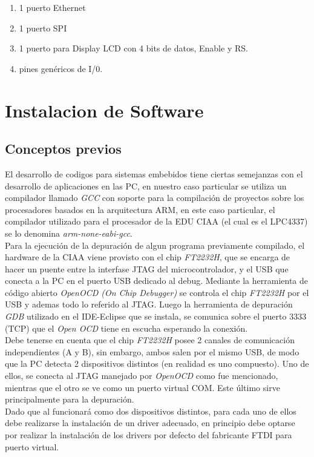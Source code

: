 \documentclass[12pt,letterpaper]{article}
\begin{document}
\begin{enumerate}
\item 1 puerto Ethernet
\item 1 puerto SPI
\item 1 puerto para Display LCD con 4 bits de datos, Enable y RS.
\item pines genéricos de I/0.
\end{enumerate}

\section{Instalacion de Software}

\subsection{Conceptos previos}
El desarrollo de codigos para sistemas embebidos tiene ciertas semejanzas con el desarrollo de aplicaciones en las PC, en nuestro caso particular se utiliza un compilador llamado \textit{GCC} con soporte para la compilación de proyectos sobre los procesadores basados en la arquitectura ARM, en este caso particular, el compilador utilizado para el procesador de la EDU CIAA (el cual es el LPC4337) se lo denomina \textit{arm-none-eabi-gcc}.\\

Para la ejecución de la depuración de algun programa previamente compilado, el hardware de la CIAA viene provisto con el chip \textit{FT2232H}, que se encarga de hacer un puente entre la interfase JTAG del microcontrolador, y el USB que conecta a la PC en el puerto USB dedicado al debug. Mediante la herramienta de código abierto \textit{OpenOCD (On Chip Debugger)} se controla el chip \textit{FT2232H} por el USB y ademas todo lo referido al JTAG. Luego la herramienta de depuración \textit{GDB} utilizado en el IDE-Eclipse que se instala, se comunica sobre el puerto 3333 (TCP) que el \textit{Open OCD} tiene en escucha esperando la conexión.\\

Debe tenerse en cuenta que el chip \textit{FT2232H} posee 2 canales de comunicación independientes (A y B), sin embargo, ambos salen por el mismo USB, de modo que la PC detecta 2 dispositivos distintos (en realidad es uno compuesto). Uno de ellos, se conecta al JTAG manejado por \textit{OpenOCD} como fue mencionado, mientras que el otro se ve como un puerto virtual COM. Este último sirve principalmente para la depuración.\\
Dado que al funcionará como dos dispositivos distintos, para cada uno de ellos debe realizarse la instalación de un driver adecuado, en principio debe optarse por realizar la instalación de los drivers por defecto del fabricante FTDI para puerto virtual.\\ %
\end{document}
